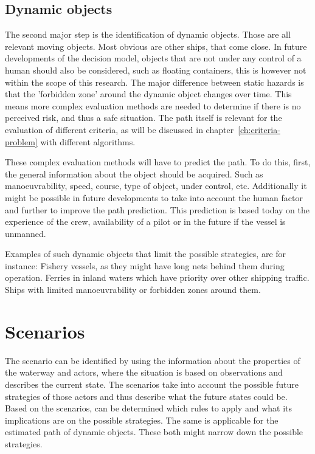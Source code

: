 \subsection{Dynamic objects}
The second major step is the identification of dynamic objects. Those are all relevant moving objects. Most obvious are other ships, that come close. In future developments of the decision model, objects that are not under any control of a human should also be considered, such as floating containers, this is however not within the scope of this research. The major difference between static hazards is that the 'forbidden zone' around the dynamic object changes over time. This means more complex evaluation methods are needed to determine if there is no perceived risk, and thus a safe situation. The path itself is relevant for the evaluation of different criteria, as will be discussed in chapter~\ref{ch:criteria-problem} with different algorithms.

These complex evaluation methods will have to predict the path. To do this, first, the general information about the object should be acquired. Such as manoeuvrability, speed, course, type of object, under control, etc.
Additionally it might be possible in future developments to take into account the human factor and further to improve the path prediction. This prediction is based today on the experience of the crew, availability of a pilot or in the future if the vessel is unmanned.

Examples of such dynamic objects that limit the possible strategies, are for instance: Fishery vessels, as they might have long nets behind them during operation. Ferries in inland waters which have priority over other shipping traffic. Ships with limited manoeuvrability or forbidden zones around them.

\section{Scenarios}
The scenario can be identified by using the information about the properties of the waterway and actors, where the situation is based on observations and describes the current state. The scenarios take into account the possible future strategies of those actors and thus describe what the future states could be.
Based on the scenarios, can be determined which rules to apply and what its implications are on the possible strategies. The same is applicable for the estimated path of dynamic objects. These both might narrow down the possible strategies.


